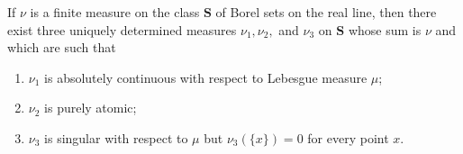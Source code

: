 If $\nu$ is a finite measure on the class $\mathbf{S}$ of Borel sets on the real line, then there exist three uniquely determined measures $\nu_1, \nu_2,$ and $\nu_3$ on $\mathbf{S}$ whose sum is $\nu$ and which are such that
\begin{enumerate}
\item $\nu_1$ is absolutely continuous with respect to Lebesgue measure $\mu$;
\item $\nu_2$ is purely atomic;
\item $\nu_3$ is singular with respect to $\mu$ but $\nu_3(\{x\}) = 0$ for every point $x$.
\end{enumerate}
